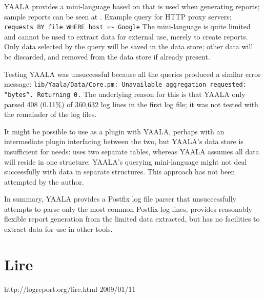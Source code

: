 YAALA provides a mini-language based on  that is used when
generating reports; sample reports can be seen at
.  Example
query for HTTP proxy servers: \newline{} \tab{} \texttt{requests BY file
WHERE host =\~{} Google} \newline{} The mini-language is quite limited and
cannot be used to extract data for external use, merely to create reports.
Only data selected by the query will be saved in the data store; other data
will be discarded, and removed from the data store if already present.

Testing YAALA was unsuccessful because all the queries produced a similar
error message:
\newline{}\tab{}\texttt{lib/Yaala/Data/Core.pm: Unavailable aggregation
requested:} \newline{}\tab{}\tab{}\texttt{``bytes''.  Returning 0.}
\newline{}  The underlying reason for this is that YAALA only parsed 408
(0.11\%) of 360,632 log lines in the first log file; it was not tested with
the remainder of the \numberOFlogFILES{} log files.

It might be possible to use \parsername{} as a plugin with YAALA, perhaps
with an intermediate plugin interfacing between the two, but YAALA's data
store is insufficient for \parsernames{} needs: \parsername{} uses two
separate tables, whereas YAALA assumes all data will reside in one
structure; YAALA's querying mini-language might not deal successfully with
data in separate structures.  This approach has not been attempted by the
author.

In summary, YAALA provides a Postfix log file parser that unsuccessfully
attempts to parse only the most common Postfix log lines, provides
reasonably flexible report generation from the limited data extracted, but
has no facilities to extract data for use in other tools.

\section{Lire}

\sloppy{}%
{http://logreport.org/lire.html}
{2009/01/11}
\fussy{}

